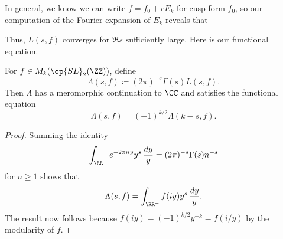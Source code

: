 \documentclass{article}
\begin{document}
\begin{remark}
	In general, we know we can write $f=f_0+cE_k$ for cusp form $f_0$, so our computation of the Fourier expansion of $E_k$ reveals that 
\end{remark}
Thus, $L(s,f)$ converges for $\Re s$ sufficiently large. Here is our functional equation.
\begin{theorem}
	For $f\in M_k(\op{SL}_2(\ZZ))$, define
	\[\Lambda(s,f)\coloneqq(2\pi)^{-s}\Gamma(s)L(s,f).\]
	Then $\Lambda$ has a meromorphic continuation to $\CC$ and satisfies the functional equation
	\[\Lambda(s,f)=(-1)^{k/2}\Lambda(k-s,f).\]
\end{theorem}
\begin{proof}
	Summing the identity
	\[\int_{\RR^+}e^{-2\pi ny}y^s\,\frac{dy}y=(2\pi)^{-s}\Gamma(s)n^{-s}\]
	for $n\ge1$ shows that
	\[\Lambda(s,f)=\int_{\RR^+}f(iy)y^s\,\frac{dy}y.\]
	The result now follows because $f(iy)=(-1)^{k/2}y^{-k}=f(i/y)$ by the modularity of $f$.
\end{proof}
\end{document}
